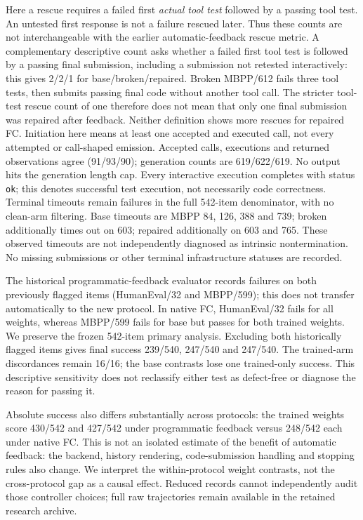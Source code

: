 Here a rescue requires a failed first \emph{actual tool test} followed by a passing
tool test. An untested first response is not a failure rescued later. Thus these
counts are not interchangeable with the earlier automatic-feedback rescue metric.
A complementary descriptive count asks whether a failed first tool test is followed
by a passing final submission, including a submission not retested interactively:
this gives 2/2/1 for base/broken/repaired. Broken MBPP/612 fails three tool tests,
then submits passing final code without another tool call. The stricter tool-test
rescue count of one therefore does not mean that only one final submission was
repaired after feedback. Neither definition shows more rescues for repaired FC.
Initiation here means at least one accepted and executed call, not every attempted
or call-shaped emission.
Accepted calls, executions and returned observations agree (91/93/90); generation
counts are 619/622/619. No output hits the generation length cap. Every interactive
execution completes with status \texttt{ok}; this denotes successful test execution,
not necessarily code correctness. Terminal timeouts remain failures in the full
542-item denominator, with no clean-arm filtering. Base timeouts are MBPP 84, 126,
388 and 739; broken additionally times out on 603; repaired additionally on 603
and 765. These observed timeouts are not independently diagnosed as intrinsic
nontermination. No missing submissions or other terminal infrastructure statuses
are recorded.

The historical programmatic-feedback evaluator records failures on both previously
flagged items (HumanEval/32 and MBPP/599); this does not transfer automatically to
the new protocol. In native FC, HumanEval/32 fails for all weights, whereas MBPP/599
fails for base but passes for both trained weights. We preserve the frozen 542-item
primary analysis. Excluding both historically flagged items gives final success
239/540, 247/540 and 247/540. The trained-arm discordances remain 16/16; the base
contrasts lose one trained-only success. This descriptive sensitivity does not
reclassify either test as defect-free or diagnose the reason for passing it.

Absolute success also differs substantially across protocols: the trained weights
score 430/542 and 427/542 under programmatic feedback versus 248/542 each under
native FC. This is not an isolated estimate of the benefit of automatic feedback:
the backend, history rendering, code-submission handling and stopping rules also
change. We interpret the within-protocol weight contrasts, not the cross-protocol
gap as a causal effect. Reduced records cannot independently audit those controller
choices; full raw trajectories remain available in the retained research archive.

